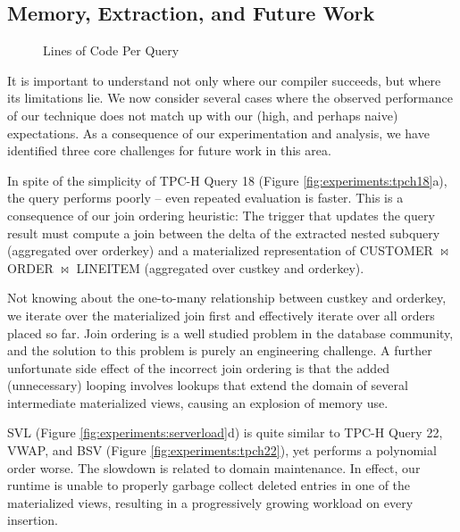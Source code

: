 
\subsection{Memory, Extraction, and Future Work}
\label{sec:experiments:future}

\begin{figure}
\begin{center}

\caption{Lines of Code Per Query}
\label{fig:experiments:loc}
\end{center}
\end{figure}

It is important to understand not only where our compiler succeeds, but where its limitations lie.  We now consider several cases where the observed performance of our technique does not match up with our (high, and perhaps naive) expectations.  As a consequence of our experimentation and analysis, we have identified three core challenges for future work in this area.

In spite of the simplicity of TPC-H Query 18 (Figure \ref{fig:experiments:tpch18}a), the query performs poorly -- even repeated evaluation is faster.  This is a consequence of our join ordering heuristic: The trigger that updates the query result must compute a join between the delta of the extracted nested subquery (aggregated over orderkey) and a materialized representation of CUSTOMER $\bowtie$ ORDER $\bowtie$ LINEITEM (aggregated over custkey and orderkey).  

Not knowing about the one-to-many relationship between custkey and orderkey, we iterate over the materialized join first and effectively iterate over all orders placed so far.  Join ordering is a well studied problem in the database community, and the solution to this problem is purely an engineering challenge.  A further unfortunate side effect of the incorrect join ordering is that the added (unnecessary) looping involves lookups that extend the domain of several intermediate materialized views, causing an explosion of memory use.

SVL (Figure \ref{fig:experiments:serverload}d) is quite similar to TPC-H Query 22, VWAP, and BSV (Figure \ref{fig:experiments:tpch22}), yet performs a polynomial order worse.  The slowdown is related to domain maintenance.  In effect, our runtime is unable to properly garbage collect deleted entries in one of the materialized views, resulting in a progressively growing workload on every insertion.  

